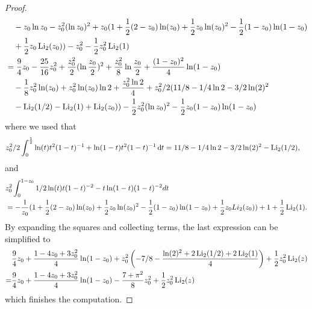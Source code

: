 \begin{proof}
\begin{align*}
	&\hspace{10pt}-z_0 \ln z_0-z_0^2(\ln z_0)^2+z_0(1 + \frac{1}{2}(2-z_0) \ln(z_0) 
		+ \frac{1}{2}z_0 \ln(z_0)^2 - \frac{1}{2} (1-z_0) \ln(1-z_0) \\
	&\hspace{10pt}+\frac{1}{2}z_0 \operatorname{Li}_2(z_0)) - z_0^2   -\frac{1}{2}  z_0^2\operatorname{Li}_2(1) \\
	&=\frac{9}{4}z_0-\frac{25}{16}z_0^2 +\frac{z_0^2}{2}(\ln\frac{z_0}{2})^2+\frac{z_0^2}{8}\ln\frac{z_0}{2} 
		+\frac{(1-z_0)^2}{4}\ln(1-z_0) \\
	&\hspace{10pt}-\frac{1}{8}z_0^2\ln(z_0)+z_0^2\ln(z_0)\ln 2+\frac{z_0^2 \ln2}{4}
		+z_0^2/2(11/8 -1/4 \ln 2 -3/2\ln(2)^2 \\
	&\hspace{10pt}- \operatorname{Li}_2(1/2)-\operatorname{Li}_2(1)+\operatorname{Li}_2(z_0)) -\frac{1}{2}z_0^2(\ln z_0)^2 - \frac{1}{2} z_0(1-z_0) \ln(1-z_0)
\end{align*}
where we used that
\begin{align*}
	z_0^2/2\int_0^{\frac{1}{2}} \ln(t)t^2(1-t)^{-1}+\ln(1-t)t^2(1-t)^{-1} \operatorname{\mathrm{d}\hspace{-2pt}} t
	&= 11/8 -1/4 \ln 2 -3/2\ln(2)^2 -  \operatorname{Li}_2(1/2),
\end{align*}
and
\begin{align*}
	&z_0^2\int_0^{1-z_0} 1/2\ln(t)t(1-t)^{-2}-t\ln(1-t)(1-t)^{-2}dt\\
	&= -\frac{1}{z_0} (1 + \frac{1}{2}(2-z_0) \ln(z_0) + \frac{1}{2}z_0 \ln(z_0)^2 - \frac{1}{2} (1-z_0) \ln(1-z_0) +\frac{1}{2}z_0 Li_2(z_0))+1   +\frac{1}{2}  \operatorname{Li}_2(1).
\end{align*}
By expanding the squares and collecting terms, the last expression can be simplified to
\begin{align*}
&\frac{9}{4} z_0 + \frac{1 - 4 z_0 + 3 z_0^2}{4}\ln(1 - z_0) + 
z_0^2 \left(-7/8 - \frac{\ln(2)^2+2\operatorname{Li}_2(1/2) + 2\operatorname{Li}_2(1)}{4} \right) + 
\frac{1}{2}z_0^2 \operatorname{Li}_2(z) \\
=&\frac{9}{4} z_0 + \frac{1 - 4 z_0 + 3 z_0^2}{4}\ln(1 - z_0) - \frac{7+\pi^2}{8}
z_0^2  + 
\frac{1}{2}z_0^2 \operatorname{Li}_2(z)
\end{align*}
which finishes the computation.
\end{proof}



